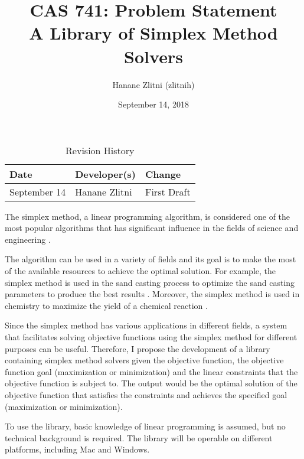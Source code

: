 \documentclass{article}
\title{CAS 741: Problem Statement\\A Library of Simplex Method Solvers}
\author{Hanane Zlitni (zlitnih)}
\date{September 14, 2018}
\begin{document}
\maketitle

\begin{table}[hp]
\caption{Revision History} \label{TblRevisionHistory}
\begin{tabularx}{\textwidth}{llX}
\toprule
\textbf{Date} & \textbf{Developer(s)} & \textbf{Change}\\
\midrule
September 14 & Hanane Zlitni & First Draft\\
\bottomrule
\end{tabularx}
\end{table}

The simplex method, a linear programming algorithm, is considered one of the most popular algorithms that has significant influence in the fields of science and engineering .\par 

The algorithm can be used in a variety of fields and its goal is to make the most of the available resources to achieve the optimal solution. For example, the simplex method is used in the sand casting process to optimize the sand casting parameters to produce the best results . Moreover, the simplex method is used in chemistry to maximize the yield of a chemical reaction .\par

Since the simplex method has various applications in different fields, a system that facilitates solving objective functions using the simplex method for different purposes can be useful. Therefore, I propose the development of a library containing simplex method solvers given the objective function, the objective function goal (maximization or minimization) and the linear constraints that the objective function is subject to. The output would be the optimal solution of the objective function that satisfies the constraints and achieves the specified goal (maximization or minimization).\par 

To use the library, basic knowledge of linear programming is assumed, but no technical background is required. The library will be operable on different platforms, including Mac and Windows.
\end{document}
